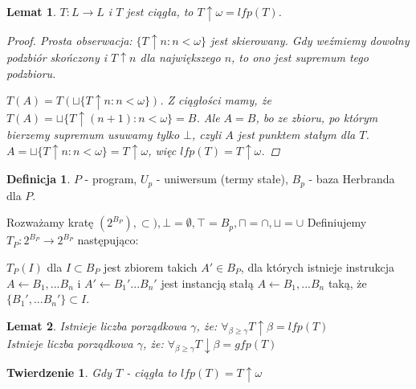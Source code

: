 \documentclass[10pt,a4paper]{article}
\theoremstyle{plain}
\newtheorem{theorem}{Twierdzenie}
\newtheorem{lemma}{Lemat}
\theoremstyle{definition}
\newtheorem*{definition}{Definicja}
\begin{document}
\begin{lemma}
 $T: L \to L$ i $T$ jest ciągła, to $T \uparrow \omega = lfp(T)$.
 \begin{proof}
  Prosta obserwacja: $\lbrace T \uparrow n : n < \omega \rbrace$ jest skierowany. 
  Gdy weźmiemy dowolny podzbiór skończony i $T \uparrow n$ dla największego $n$, 
  to ono jest supremum tego podzbioru.   
  
  $T(A) = T(\sqcup \lbrace T \uparrow n : n < \omega \rbrace)$. Z ciągłości mamy, że 
  $T(A) = \sqcup \lbrace T \uparrow (n+1) : n < \omega \rbrace = B$. Ale $A = B$, bo 
  ze zbioru, po którym bierzemy supremum usuwamy tylko $\bot$, czyli $A$ jest 
  punktem stałym dla $T$. $A = \sqcup \lbrace T \uparrow n : n < \omega \rbrace = T \uparrow \omega$, więc 
  $lfp(T) = T \uparrow \omega$.
 \end{proof}
\end{lemma}

\begin{definition}
 $P$ - program, $U_p$ - uniwersum (termy stałe), $B_p$ - baza Herbranda dla $P$.   
 
 Rozważamy kratę $(2^{B_P}), \subset), \bot = \emptyset, \top = B_p, \sqcap = \cap, \sqcup = \cup$ 
 Definiujemy $T_P : 2^{B_P} \to 2^{B_P}$ następująco:  
 
 $T_P(I)$ dla $I \subset B_P$ jest zbiorem takich $A' \in B_P$, dla których istnieje 
 instrukcja $A \leftarrow B_1, ... B_n$ i $A' \leftarrow B_1' ... B_n'$ jest instancją stałą
 $A \leftarrow B_1, ... B_n$ taką, że $\lbrace B_1', ... B_n'\rbrace \subset I$.
 

\end{definition}


\begin{lemma}
Istnieje liczba porządkowa $\gamma$, że: $\forall_{\beta\geq\gamma} T \uparrow\beta = lfp(T)$\\
Istnieje liczba porządkowa $\gamma$, że: $\forall_{\beta\geq\gamma} T \downarrow\beta = gfp(T)$
\end{lemma}

\begin{theorem}
Gdy $T$ - ciągła to $lfp(T) = T \uparrow \omega$
\end{theorem}
\end{document}
